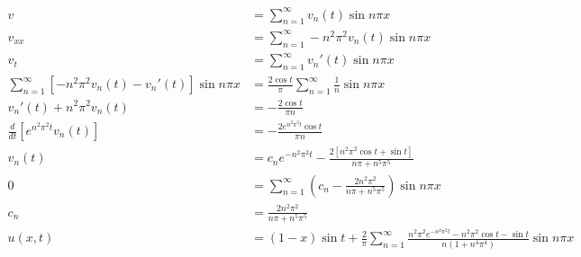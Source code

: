 \documentclass{article}
\begin{document}
\begin{align*}
  v                                                              & = \sum_{n = 1}^\infty v_n(t) \sin n \pi x                                                                                                          \\
  v_{x x}                                                        & = \sum_{n = 1}^\infty -n^2 \pi^2 v_n(t) \sin n \pi x                                                                                               \\
  v_t                                                            & = \sum_{n = 1}^\infty v_n'(t) \sin n \pi x                                                                                                         \\
  \sum_{n = 1}^\infty [-n^2 \pi^2 v_n(t) - v_n'(t)] \sin n \pi x & = \frac{2 \cos t}{\pi} \sum_{n = 1}^\infty \frac{1}{n} \sin n \pi x                                                                                \\
  v_n'(t) + n^2 \pi^2 v_n(t)                                     & = -\frac{2 \cos t}{\pi n}                                                                                                                          \\
  \frac{d}{d t} [e^{n^2 \pi^2 t} v_n(t)]                         & = -\frac{2 e^{n^2 \pi^2 t} \cos t}{\pi n}                                                                                                          \\
  v_n(t)                                                         & = c_n e^{-n^2 \pi^2 t} - \frac{2 [n^2 \pi^2 \cos t + \sin t]}{n \pi + n^5 \pi^5}                                                                   \\
  0                                                              & = \sum_{n = 1}^\infty \left( c_n - \frac{2 n^2 \pi^2}{n \pi + n^5 \pi^5} \right) \sin n \pi x                                                      \\
  c_n                                                            & = \frac{2 n^2 \pi^2}{n \pi + n^5 \pi^5}                                                                                                            \\
  u(x, t)                                                        & = (1 - x) \sin t + \frac{2}{\pi} \sum_{n = 1}^\infty \frac{n^2 \pi^2 e^{-n^2 \pi^2 t} - n^2 \pi^2 \cos t - \sin t}{n (1 + n^4 \pi^4)} \sin n \pi x
\end{align*}
\end{document}
